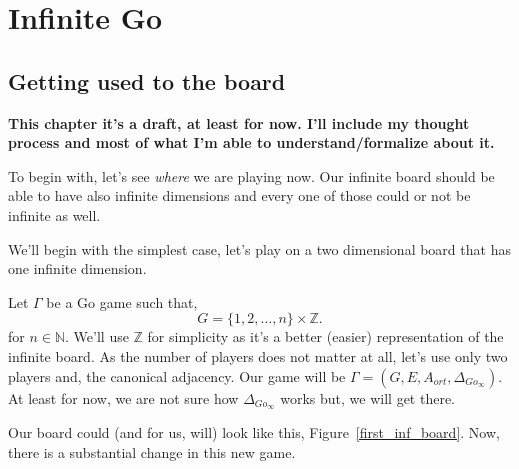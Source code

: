 {\centering
	\chapter{Infinite Go}\label{infgo}}
	
\section{Getting used to the board}
\thispagestyle{empty}
\noindent
{\large\textbf{This chapter it's a draft, at least for now. I'll include my thought process and most of what I'm able to understand/formalize about it.}}
\vspace{20pt}

To begin with, let's see \textit{where} we are playing now. Our infinite board should be able to have also infinite dimensions and every one of those could or not be infinite as well.

We'll begin with the simplest case, let's play on a two dimensional board that has one infinite dimension.

Let $\Gamma$ be a Go game such that,
$$G=\{1,2,\dots,n\}\times \mathbb{Z}.$$
for $n\in \mathbb{N}$. We'll use $\mathbb{Z}$ for simplicity as it's a better (easier) representation of the infinite board.
As the number of players does not matter at all, let's use only two players and, the canonical adjacency.
Our game will be $\Gamma=(G,E,A_{ort},\Delta_{Go_{\infty}})$.
At least for now, we are not sure how $\Delta_{Go_{\infty}}$ works but, we will get there.

Our board could (and for us, will) look like this, Figure~\ref{first_inf_board}. Now, there is a substantial change in this new game.

